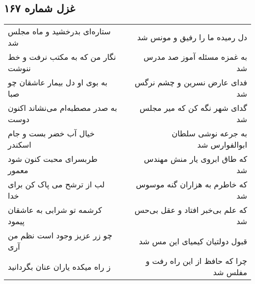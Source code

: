 \begin{center}
\section*{غزل شماره ۱۶۷}
\label{sec:sh167}
\begin{longtable}{l p{0.5cm} r}
ستاره‌ای بدرخشید و ماه مجلس شد
&&
دل رمیده ما را رفیق و مونس شد
\\
نگار من که به مکتب نرفت و خط ننوشت
&&
به غمزه مسئله آموز صد مدرس شد
\\
به بوی او دل بیمار عاشقان چو صبا
&&
فدای عارض نسرین و چشم نرگس شد
\\
به صدر مصطبه‌ام می‌نشاند اکنون دوست
&&
گدای شهر نگه کن که میر مجلس شد
\\
خیال آب خضر بست و جام اسکندر
&&
به جرعه نوشی سلطان ابوالفوارس شد
\\
طربسرای محبت کنون شود معمور
&&
که طاق ابروی یار منش مهندس شد
\\
لب از ترشح می پاک کن برای خدا
&&
که خاطرم به هزاران گنه موسوس شد
\\
کرشمه تو شرابی به عاشقان پیمود
&&
که علم بی‌خبر افتاد و عقل بی‌حس شد
\\
چو زر عزیز وجود است نظم من آری
&&
قبول دولتیان کیمیای این مس شد
\\
ز راه میکده یاران عنان بگردانید
&&
چرا که حافظ از این راه رفت و مفلس شد
\\
\end{longtable}
\end{center}
